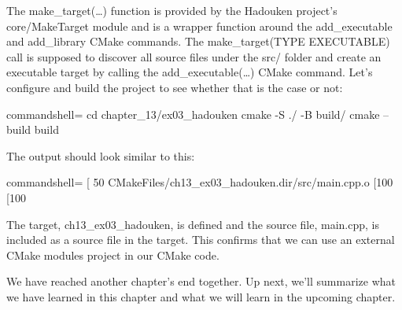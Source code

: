 The make\_target(…) function is provided by the Hadouken project's core/MakeTarget module and is a wrapper function around the add\_executable and add\_library CMake commands. The make\_target(TYPE EXECUTABLE) call is supposed to discover all source files under the src/ folder and create an executable target by calling the add\_executable(…) CMake command. Let's configure and build the project to see whether that is the case or not:

\begin{tcblisting}{commandshell={}}
cd chapter_13/ex03_hadouken
cmake -S ./ -B build/
cmake --build build
\end{tcblisting}

The output should look similar to this:

\begin{tcblisting}{commandshell={}}
[ 50%
  CMakeFiles/ch13_ex03_hadouken.dir/src/main.cpp.o
[100%
[100%
\end{tcblisting}

The target, ch13\_ex03\_hadouken, is defined and the source file, main.cpp, is included as a source file in the target. This confirms that we can use an external CMake modules project in our CMake code.

We have reached another chapter's end together. Up next, we'll summarize what we have learned in this chapter and what we will learn in the upcoming chapter.











